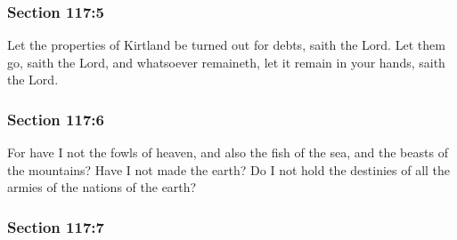 
	\subsubsection{Section 117:5} %
		\label{DC117-5}

		Let the properties of Kirtland be turned out for debts, saith the Lord.  Let them go, saith the Lord, and whatsoever remaineth, let it remain in your hands, saith the Lord.


	\subsubsection{Section 117:6} %
		\label{DC117-6}

		For have I not the fowls of heaven, and also the fish of the sea, and the beasts of the mountains?  Have I not made the earth?  Do I not hold the destinies of all the armies of the nations of the earth?


	\subsubsection{Section 117:7} %
		\label{DC117-7}

